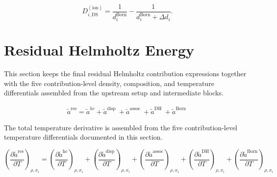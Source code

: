 \documentclass[12pt, letterpaper]{article}
\begin{document}
\begin{equation}
D_{i,\mathrm{DS}}^{(\mathrm{ion})}
=
\frac{1}{d_i^{\mathrm{Born}}}
-
\frac{1}{d_i^{\mathrm{Born}}+\Delta d_i}.
\label{eq:D_ds}
\end{equation}

\section{Residual Helmholtz Energy}
\label{sec:ares}

This section keeps the final residual Helmholtz contribution expressions together with the five contribution-level density, composition, and temperature differentials assembled from the upstream setup and intermediate blocks.


\begin{align}
    \tilde{a}^{\mathrm{res}}=\tilde{a}^{h c}+\tilde{a}^{\text {disp }}+\tilde{a}^{\text {assoc }}+\tilde{a}^{\text {DH }}+\tilde{a}^{\text {Born }}
    \label{eq:ares_total}
\end{align}

The total temperature derivative is assembled from the five contribution-level temperature differentials documented in this section.

\begin{equation}
    \left(\frac{\partial\tilde{a}^\mathrm{res}}{\partial T}\right)_{\rho,x_{i}} =\left(\frac{\partial\tilde{a}^\mathrm{hc}}{\partial T}\right)_{\rho,x_{i}} +\left(\frac{\partial\tilde{a}^\mathrm{disp}}{\partial T}\right)_{\rho,x_{i}}
    +\left(\frac{\partial\tilde{a}^\mathrm{assoc}}{\partial T}\right)_{\rho,x_{i}}
    +\left(\frac{\partial\tilde{a}^\mathrm{DH}}{\partial T}\right)_{\rho,x_{i}}
    +\left(\frac{\partial\tilde{a}^\mathrm{Born}}{\partial T}\right)_{\rho,x_{i}}
    \label{eq:dares_dT}
\end{equation}
\end{document}
